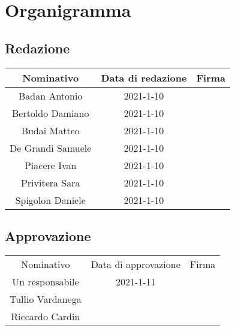 \section{Organigramma}
\subsection{Redazione}
\begin{table}[H]
	\centering
	\renewcommand{\arraystretch}{1.5}
	\begin{tabular}{|c|c|c|}
		\hline
		\rowcolor{lighter-grayer}
		Nominativo & Data di redazione & Firma \\
		\hline
		Badan Antonio & 2021-1-10 & \\
		\hline
		Bertoldo Damiano & 2021-1-10 & \\
		\hline
		Budai Matteo & 2021-1-10 &  \\
		\hline
		De Grandi Samuele & 2021-1-10 & \\
		\hline
		Piacere Ivan & 2021-1-10 & \\
		\hline
		Privitera Sara & 2021-1-10 & \\
		\hline
		Spigolon Daniele & 2021-1-10 & \\
		\hline
	\end{tabular}
\end{table}

\subsection{Approvazione}
\begin{table}[H]
	\centering
	\renewcommand{\arraystretch}{1.5}
	\begin{tabular}{|c|c|c|}
		\hline
		\rowcolor{lighter-grayer}
		Nominativo & Data di approvazione & Firma \\
		Un responsabile & 2021-1-11 & \\
		\hline
		Tullio Vardanega & & \\
		\hline
		Riccardo Cardin & & \\
		\hline
	\end{tabular}
\end{table}
